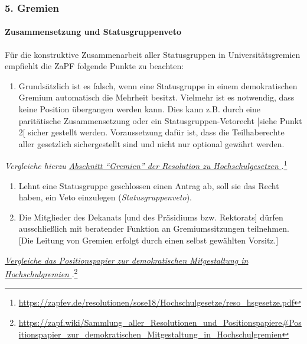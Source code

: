 \documentclass[DIV=calc]{scrartcl}
\begin{document}
\pagebreak
\hypertarget{gremien}{%
\subsubsection*{5. Gremien}\label{gremien}}

\hypertarget{zusammensetzung-und-statusgruppenveto}{%
\paragraph{Zusammensetzung und Statusgruppenveto}\label{zusammensetzung-und-statusgruppenveto}}

Für die konstruktive Zusammenarbeit aller Statusgruppen in Universitätsgremien empfiehlt die ZaPF folgende Punkte zu beachten:

\begin{enumerate}
\def\labelenumi{\arabic{enumi})}
\item Grundsätzlich ist es falsch, wenn eine Statusgruppe in einem demokratischen Gremium automatisch die Mehrheit besitzt. Vielmehr ist es notwendig, dass keine Position übergangen werden kann. Dies kann z.B. durch eine paritätische Zusammensetzung oder ein Statusgruppen-Vetorecht {[}siehe Punkt 2{[} sicher gestellt werden. Voraussetzung dafür ist, dass die Teilhaberechte aller gesetzlich sichergestellt sind und nicht nur optional gewährt werden.
\end{enumerate}

\emph{Vergleiche hierzu }\href{https://zapfev.de/resolutionen/sose18/Hochschulgesetze/reso_hsgesetze.pdf}{\emph{Abschnitt \enquote{Gremien} der Resolution zu Hochschulgesetzen
  }}.\footnote{\url{https://zapfev.de/resolutionen/sose18/Hochschulgesetze/reso_hsgesetze.pdf}}

\begin{enumerate}
\def\labelenumi{\arabic{enumi})}
\setcounter{enumi}{1}
\item Lehnt eine Statusgruppe geschlossen einen Antrag ab, soll sie das Recht haben, ein Veto einzulegen (\emph{Statusgruppenveto}). 

\item Die Mitglieder des Dekanats {[}und des Präsidiums bzw. Rektorats{]} dürfen ausschließlich mit beratender Funktion an Gremiumssitzungen teilnehmen. {[}Die Leitung von Gremien erfolgt durch einen selbst gewählten Vorsitz.{]}
\end{enumerate}

\href{https://zapf.wiki/Sammlung_aller_Resolutionen_und_Positionspapiere\#Positionspapier_zur_demokratischen_Mitgestaltung_in_Hochschulgremien}{\emph{Vergleiche das Positionspapier zur demokratischen Mitgestaltung in Hochschulgremien
  }}.\footnote{\url{https://zapf.wiki/Sammlung_aller_Resolutionen_und_Positionspapiere\#Positionspapier_zur_demokratischen_Mitgestaltung_in_Hochschulgremien}}
\end{document}
